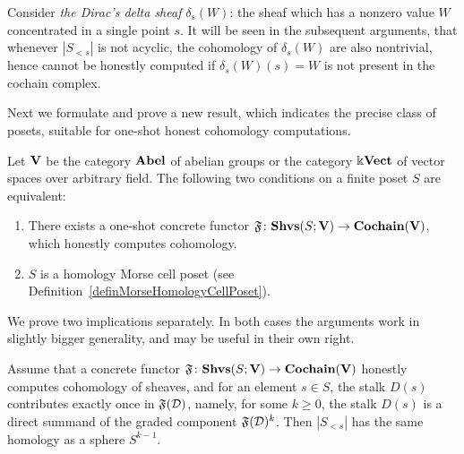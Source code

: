 \begin{con}\label{conDiracDiagram}
Consider \emph{the Dirac's delta sheaf} $\delta_s(W)$: the sheaf which has a nonzero value $W$ concentrated in a single point $s$. It will be seen in the subsequent arguments, that whenever $|S_{<s}|$ is not acyclic, the cohomology of $\delta_s(W)$ are also nontrivial, hence cannot be honestly computed if $\delta_s(W)(s)=W$ is not present in the cochain complex.
\end{con}

Next we formulate and prove a new result, which indicates the precise class of posets, suitable for one-shot honest cohomology computations. %

\begin{thm}\label{thmOneShotTheorem}
Let $\mathbf{V}$ be the category $\mathbf{Abel}$ of abelian groups or the category $\Bbbk\mathbf{Vect}$ of vector spaces over arbitrary field. The following two conditions on a finite poset $S$ are equivalent:
\begin{enumerate}
  \item There exists a one-shot concrete functor $\mathfrak{F}\colon\mathbf{Shvs}(S;\mathbf{V})\to\mathbf{Cochain}(\mathbf{V})$, which honestly computes cohomology.
  \item $S$ is a homology Morse cell poset (see Definition~\ref{definMorseHomologyCellPoset}).
\end{enumerate}
\end{thm}

We prove two implications separately. In both cases the arguments work in slightly bigger generality, and may be useful in their own right.

\begin{prop}\label{propOneShotOnePosition}
Assume that a concrete functor $\mathfrak{F}\colon\mathbf{Shvs}(S;\mathbf{V})\to\mathbf{Cochain}(\mathbf{V})$ honestly computes cohomology of sheaves, and for an element $s\in S$, the stalk $D(s)$ contributes exactly once in $\mathfrak{F}(\mathcal{D})$, namely, for some $k\geqslant 0$, the stalk $D(s)$ is a direct summand of the graded component $\mathfrak{F}(\mathcal{D})^k$. Then $|S_{<s}|$ has the same homology as a sphere $S^{k-1}$.
\end{prop}

